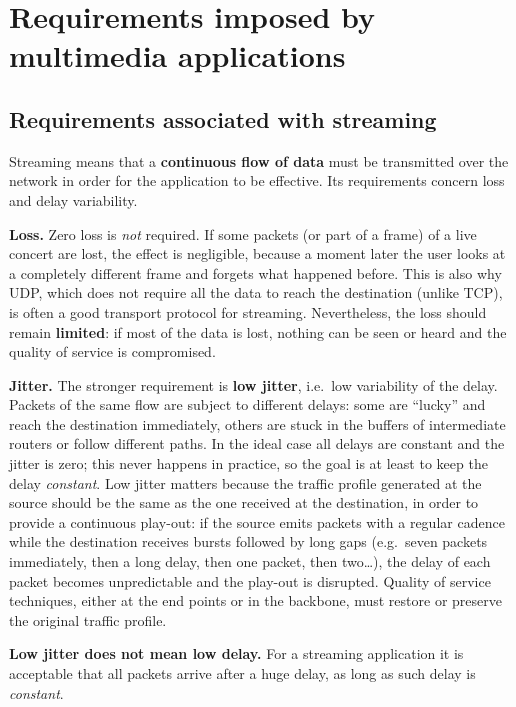 \documentclass[11pt,a4paper,openany]{report}
\begin{document}
\section{Requirements imposed by multimedia applications}

\subsection{Requirements associated with streaming}

Streaming means that a \textbf{continuous flow of data} must be transmitted over the network in order for the application to be effective. Its requirements concern loss and delay variability.

\textbf{Loss.} Zero loss is \emph{not} required. If some packets (or part of a frame) of a live concert are lost, the effect is negligible, because a moment later the user looks at a completely different frame and forgets what happened before. This is also why UDP, which does not require all the data to reach the destination (unlike TCP), is often a good transport protocol for streaming. Nevertheless, the loss should remain \textbf{limited}: if most of the data is lost, nothing can be seen or heard and the quality of service is compromised.

\textbf{Jitter.} The stronger requirement is \textbf{low jitter}, i.e.\ low variability of the delay. Packets of the same flow are subject to different delays: some are ``lucky'' and reach the destination immediately, others are stuck in the buffers of intermediate routers or follow different paths. In the ideal case all delays are constant and the jitter is zero; this never happens in practice, so the goal is at least to keep the delay \emph{constant}. Low jitter matters because the traffic profile generated at the source should be the same as the one received at the destination, in order to provide a continuous play-out: if the source emits packets with a regular cadence while the destination receives bursts followed by long gaps (e.g.\ seven packets immediately, then a long delay, then one packet, then two\ldots), the delay of each packet becomes unpredictable and the play-out is disrupted. Quality of service techniques, either at the end points or in the backbone, must restore or preserve the original traffic profile.

\begin{notebox}
	\textbf{Low jitter does not mean low delay.} For a streaming application it is acceptable that all packets arrive after a huge delay, as long as such delay is \emph{constant}.
\end{notebox}
\end{document}
